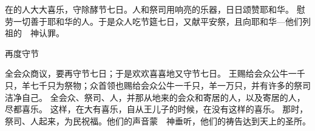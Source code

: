 {在{}的{}人大大喜乐，守除酵节七日。{}人和祭司用响亮的乐器，日日颂赞耶和华。
慰劳一切善于{}耶和华的{}人。于是众人吃节筵七日，又献平安祭，且向耶和华—他们列祖的　神认罪。
\par }{\SH 再度守节
\par }{\PP {}全会众商议，要再守节七日；于是欢欢喜喜地又守节七日。
王{}赐给会众公牛一千只，羊七千只为祭物；众首领也赐给会众公牛一千只，羊一万只，并有许多的祭司洁净自己。
全会众、祭司、{}人，并那从{}地来的会众和寄居的人，以及{}寄居的人，尽都喜乐。
这样，在{}大有喜乐，自从{}王{}儿子{}的时候，在{}没有这样的喜乐。
那时，祭司、{}人起来，为民祝福。他们的声音蒙　神垂听，他们的祷告达到天上的圣所。

}
